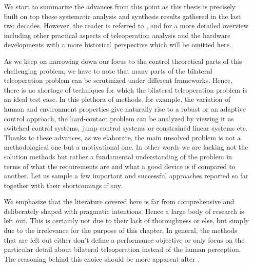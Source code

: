 We start to summarize the advances from this point as this thesis is precisely built on top these systematic 
analysis and synthesis results gathered in the last two decades. However, the reader is referred to 
\cite{hokayemspong,burdea}, and \cite{sheridan89} for a more detailed overview including other practical 
aspects of teleoperation analysis and the hardware developments with a more historical perspective which 
will be omitted here. 


As we keep on narrowing down our focus to the control theoretical parts of this challenging problem, we have to 
note that many parts of the bilateral teleoperation problem can be scrutinized under different frameworks. 
Hence, there is no shortage of techniques for which the bilateral teleoperation problem is an ideal 
test case. In this plethora of methods, for example, the variation of human and environment properties give 
naturally rise to a robust or an adaptive control approach, the hard-contact problem can be analyzed by viewing it
as switched control systems, jump control systems or constrained linear systems etc. Thanks to these advances, 
as we elaborate, the main unsolved problem is not a methodological one but a motivational one. In
other words we are lacking not the solution methods but rather a fundamental understanding of the problem in terms of 
what the requirements are and what a good device is if compared to another. Let us sample a few important and 
successful approaches reported so far together with their shortcomings if any. 

We emphasize that the literature 
covered here is far from comprehensive and deliberately shaped with pragmatic intentions. Hence a large body of 
research is left out. This is certainly not due to their lack of thoroughness or else, but simply due to the irrelevance 
for the purpose of this chapter. In general, the methods that are left out either don't define a performance
objective or only focus on the particular detail about bilateral teleoperation instead of the human perception. 
The reasoning behind this choice should be more apparent after .


